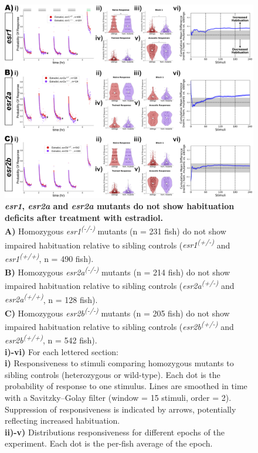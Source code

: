 \documentclass[9pt,lineno]{RandlettLab_elife}
\begin{document}
{\begin{figure}
\begin{fullwidth}
\begin{center}
\includegraphics[width=0.8\linewidth]{figures/NuclearSingleMutants.png}
\caption{\textbf{\emph{esr1}, \emph{esr2a} and \emph{esr2a} mutants do not show habituation deficits after treatment with estradiol.} \scriptsize
\\ \textbf{A)} Homozygous \emph{esr1\textsuperscript{(-/-)}} mutants (n = 231 fish) do not show impaired habituation relative to sibling controls (\emph{esr1\textsuperscript{(+/-)}} and \emph{esr1\textsuperscript{(+/+)}}, n = 490 fish). 
\\ \textbf{B)} Homozygous \emph{esr2a\textsuperscript{(-/-)}} mutants (n = 214 fish) do not show impaired habituation relative to sibling controls (\emph{esr2a\textsuperscript{(+/-)}} and \emph{esr2a\textsuperscript{(+/+)}}, n = 128 fish).
\\ \textbf{C)} Homozygous \emph{esr2b\textsuperscript{(-/-)}} mutants (n = 205 fish) do not show impaired habituation relative to sibling controls (\emph{esr2b\textsuperscript{(+/-)}} and \emph{esr2b\textsuperscript{(+/+)}}, n = 542 fish). 
\\ \textbf{i)-vi)} For each lettered section: 
\\ \textbf{i)} Responsiveness to stimuli comparing homozygous mutants to sibling controls (heterozygous or wild-type). 
Each dot is the probability of response to one stimulus. Lines are smoothed in time with a Savitzky–Golay filter (window = 15 stimuli, order = 2). 
Suppression of responsiveness is indicated by arrows, potentially reflecting increased habituation.
\\ \textbf{ii)-v)} Distributions responsiveness for different epochs of the experiment. Each dot is the per-fish average of the epoch. 
}
\end{center}
\end{fullwidth}
\end{figure}}
\end{document}
